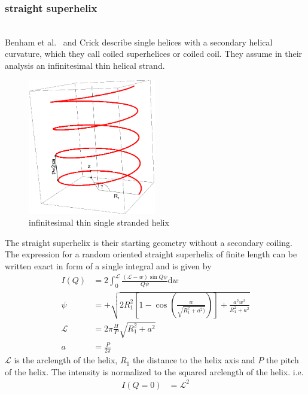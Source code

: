 \newpage
\subsubsection{straight superhelix} ~\\
Benham et al.\ \cite{Benham1980} and Crick \cite{Crick1953} describe single helices with a secondary helical curvature, which they call coiled superhelices or coiled coil. They assume in their analysis an infinitesimal thin helical strand.
\begin{figure}[htb]
\begin{center}
\includegraphics[width=0.497\textwidth]{../images/form_factor/cylindrical_obj/straightSuperhelix.png}
\end{center}
\caption{infinitesimal thin single stranded helix} \label{fig:straightsuperhelix}
\end{figure}
 The straight superhelix is their starting geometry without a secondary coiling. The expression for a random oriented straight superhelix of finite length can be written exact in form of a single integral and is given by
\begin{align}
I(Q) &= 2 \int_0^{\mathcal{L}} \frac{(\mathcal{L}-w)\sin Q\psi}{Q\psi} \mathrm{d}w \\
\psi &= + \sqrt{2 R_1^2\left[1-\cos\left(\frac{w}{\sqrt{R_1^2+a^2)}}\right) \right]+\frac{a^2w^2}{R_1^2+a^2}} \\
\mathcal{L} &= 2\pi \frac{H}{P} \sqrt{R_1^2+a^2} \\
a &= \frac{P}{2\pi}
\end{align}
$\mathcal{L}$ is the arclength of the helix, $R_1$ the distance to the helix axis and $P$ the pitch of the helix. The intensity is normalized to the squared arclength of the helix. i.e.
\begin{align}
I(Q=0)&=\mathcal{L}^2
\end{align}

